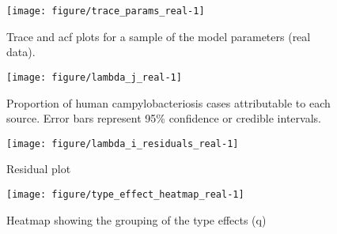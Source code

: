 \begin{knitrout}
\color{fgcolor}\begin{figure}

{\centering \texttt{[image: figure/trace\_params\_real-1]} 

}

\caption[Trace and acf plots for a sample of the model parameters (real data)]{Trace and acf plots for a sample of the model parameters (real data).}\label{fig:trace_params_real}
\end{figure}


\end{knitrout}

\begin{knitrout}
\color{fgcolor}\begin{figure}

{\centering \texttt{[image: figure/lambda\_j\_real-1]} 

}

\caption[Proportion of human campylobacteriosis cases attributable to each source]{Proportion of human campylobacteriosis cases attributable to each source. Error bars represent 95\% confidence or credible intervals.}\label{fig:lambda_j_real}
\end{figure}


\end{knitrout}

\begin{knitrout}
\color{fgcolor}\begin{figure}

{\centering \texttt{[image: figure/lambda\_i\_residuals\_real-1]} 

}

\caption[Residual plot]{Residual plot}\label{fig:lambda_i_residuals_real}
\end{figure}


\end{knitrout}

\begin{knitrout}
\color{fgcolor}\begin{kframe}


{\ttfamily\noindent\bfseries\color{errorcolor}{\#\# Error in `row.names<-.data.frame`(`*tmp*`, value = value): invalid 'row.names' length}}

{\ttfamily\noindent\bfseries\color{errorcolor}{\#\# Error in plot.new(): figure margins too large}}\end{kframe}\begin{figure}

{\centering \texttt{[image: figure/type\_effect\_heatmap\_real-1]} 

}

\caption[Heatmap showing the grouping of the type effects (q)]{Heatmap showing the grouping of the type effects (q)}\label{fig:type_effect_heatmap_real}
\end{figure}


\end{knitrout}


